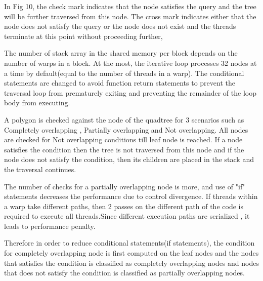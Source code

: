 \documentclass{article}
\begin{document}
In Fig 10,  the check mark indicates that the node  satisfies the query and the tree will be further traversed from this node. The cross mark indicates either that the node does not satisfy the query or the node does not exist and the threads terminate at this point without proceeding further,

The number of stack array in the shared memory per block depends on the number of warps in a block. At the most, the iterative loop processes 32 nodes at a time by default(equal to the number of threads in a warp). 
The conditional statements are changed to avoid function return statements to prevent the traversal loop from prematurely exiting and preventing the remainder of the loop body from executing.

A polygon is checked against the node of the quadtree for 3 scenarios such as Completely overlapping , Partially overlapping  and Not overlapping.
All nodes are checked for Not overlapping conditions till leaf node is reached. If a node satisfies the condition then the tree is not traversed from this node and if the node does not satisfy the condition, then its children are placed in the stack and the traversal continues.

The number of checks for a partially overlapping node is more, and use of "if" statements decreases the performance due to control divergence. If threads within a warp take different paths, then 2 passes on the different path of the code is required to execute all threads.Since different execution paths are serialized , it leads to performance penalty.

Therefore in order to reduce conditional statements(if statements), the condition for completely overlapping node is first computed on the leaf nodes and the nodes that satisfies the condition is classified as completely overlapping nodes and nodes that does not satisfy the condition is classified as partially overlapping nodes.
\end{document}
